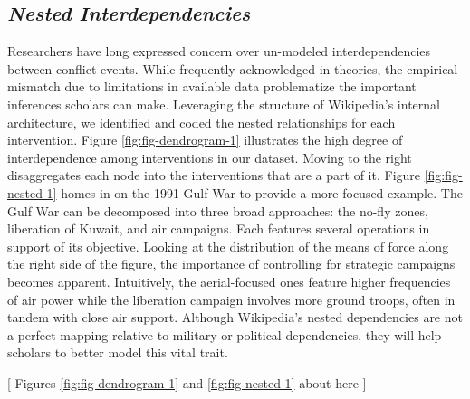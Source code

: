 \documentclass[fleqn,12pt]{article}
\begin{document}
\subsection*{\textit{Nested Interdependencies}}
Researchers have long expressed concern over un-modeled interdependencies between conflict events. While frequently acknowledged in theories, the empirical mismatch due to limitations in available data problematize the important inferences scholars can make. Leveraging the structure of Wikipedia’s internal architecture, we identified and coded the nested relationships for each intervention. Figure \ref{fig:fig-dendrogram-1} illustrates the high degree of interdependence among interventions in our dataset. Moving to the right disaggregates each node into the interventions that are a part of it. Figure \ref{fig:fig-nested-1} homes in on the 1991 Gulf War to provide a more focused example. The Gulf War can be decomposed into three broad approaches: the no-fly zones, liberation of Kuwait, and air campaigns. Each features several operations in support of its objective. Looking at the distribution of the means of force along the right side of the figure, the importance of controlling for strategic campaigns becomes apparent. Intuitively, the aerial-focused ones feature higher frequencies of air power while the liberation campaign involves more ground troops, often in tandem with close air support. Although Wikipedia’s nested dependencies are not a perfect mapping relative to military or political dependencies, they will help scholars to better model this vital trait. 

\begin{center}
	[ Figures \ref{fig:fig-dendrogram-1} and \ref{fig:fig-nested-1} about here ]
\end{center}
\end{document}
